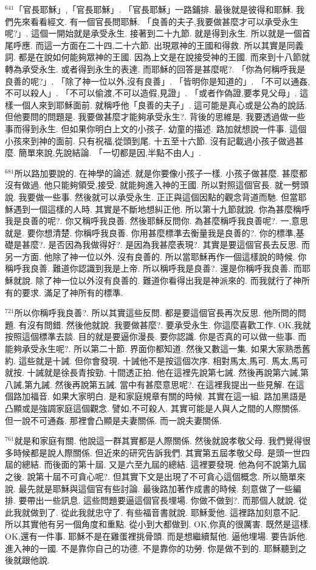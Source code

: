 \documentclass{book}
\begin{document}
$^{641}$「官長耶穌」,「官長耶穌」.
「官長耶穌」一路鋪排.
最後就是彼得和耶穌.
我們先來看看經文.
有一個官長問耶穌.
「良善的夫子,我要做甚麼才可以承受永生呢?」.
這個一開始就是承受永生.
接著到二十九節.
就是得到永生.
所以就是一個首尾呼應.
而這一方面在二十四,二十六節.
出現眾神的王國和得救.
所以其實是同義詞.
都是在說如何能夠眾神的王國.
因為上文是在說接受神的王國.
而來到十八節就轉為承受永生.
或者得到永生的表達.
而耶穌的回答是甚麼呢?.
「你為何稱呼我是良善的呢?」.
「除了神一位以外,沒有良善」.
「皆明你是知道的」.
「不可以通姦,不可以殺人」.
「不可以偷渡,不可以造假,見證」.
「或者作偽證,要孝見父母」.
這樣一個人來到耶穌面前.
就稱呼他「良善的夫子」.
這可能是真心或是公為的說話.
但他要問的問題是.
我要做甚麼才能夠承受永生?.
背後的思維是.
我要透過做一些事而得到永生.
但如果你明白上文的小孩子.
幼童的描述.
路加就想說一件事.
這個小孩來到神的面前.
只有祝福,從頭到尾.
十五至十六節.
沒有記載過小孩子做過甚麼.
簡單來說,先說結論.
「一切都是因,半點不由人」.

$^{681}$所以路加要說的.
在神學的論述.
就是你要像小孩子一樣.
小孩子做甚麼.
甚麼都沒有做過.
他只能夠領受,接受.
就能夠進入神的王國.
所以對照這個官長.
就一劈頭說.
我要做一些事.
然後就可以承受永生.
正正與這個因點的觀念背道而馳.
但當耶穌遇到一個這樣的人時.
其實是不斷地想糾正他.
所以第十九節就說.
你為甚麼稱呼我是良善的呢?.
你又稱呼我良善.
然後耶穌反問你.
為甚麼稱呼我良善呢?.
一,意思就是.
要你想清楚.
你稱呼我良善.
你用甚麼標準去衡量我是良善的?.
你的標準,基礎是甚麼?.
是否因為我做得好?.
是因為我甚麼表現?.
其實是要這個官長去反思.
而另一方面.
他除了神一位以外.
沒有良善的.
所以當耶穌再作一個這樣說的時候.
你稱呼我良善.
難道你認識到我是上帝.
所以稱呼我是良善?.
還是你稱呼我良善.
而耶穌就說.
除了神一位以外沒有良善的.
難道你看得出我是神派來的.
而我就行了神所有的要求.
滿足了神所有的標準.

$^{721}$所以你稱呼我良善?.
所以其實這些反問.
都是要這個官長再次反思.
他所問的問題.
有沒有問錯.
然後他就說.
我要做甚麼?.
要承受永生.
你這麼喜歡工作.
OK,我就按照這個標準去談.
目的就是要逼你漫長.
要你認識.
你是否真的可以做一些事.
而能夠承受永生呢?.
所以第二十節.
界面你都知道.
然後又數這一集.
如果大家熟悉舊約.
這些就是十誡.
但你會發現.
十誡他不是按這個次序.
相對馬太,馬可.
馬太,馬可就按.
十誡就是徐長青按勁.
十間透正拍.
他在這裡先說第七誡.
然後再說第六誡,第八誡,第九誡.
然後再說第五誡.
當中有甚麼意思呢?.
在這裡我提出一些見解.
在這個路加福音.
如果大家明白.
是和家庭規章有關的時候.
其實在這一組.
路加黑語是凸顯或是強調家庭這個觀念.
譬如,不可殺人.
其實可能是人與人之間的人際關係.
但一說不可通姦.
那裡會凸顯是夫妻關係.
而一說夫妻關係.

$^{761}$就是和家庭有關.
他說這一群其實都是人際關係.
然後就說孝敬父母.
我們覺得很多時候都是說人際關係.
但近來的研究告訴我們.
其實第五屆孝敬父母.
是頭一世四屆的總結.
而後面的第十屆.
又是六至九屆的總結.
這裡要發現.
他為何不說第九屆之後.
說第十屆不可貪心呢?.
但其實下文是出現了不可貪心這個概念.
所以簡單來說.
最先就是耶穌與這個官有些討論.
最後路加著作成書的時候.
刻意做了一些編排.
要帶出一些訊息.
這些問題要逼這個官長埋場.
你做不做到?.
而那個人就說.
從此我就做到了.
從此我就忠守了.
有些福音書就說.
耶穌愛他.
這裡路加刻意不記.
所以其實他有另一個角度和重點.
從小到大都做到.
OK,你真的很厲害.
既然是這樣.
OK,還有一件事.
耶穌不是在雞蛋裡挑骨頭.
而是想繼續幫他.
逼他埋場.
要告訴他.
進入神的一國.
不是靠你自己的功德.
不是靠你的功勞.
你是做不到的.
耶穌聽到之後就跟他說.
\end{document}
